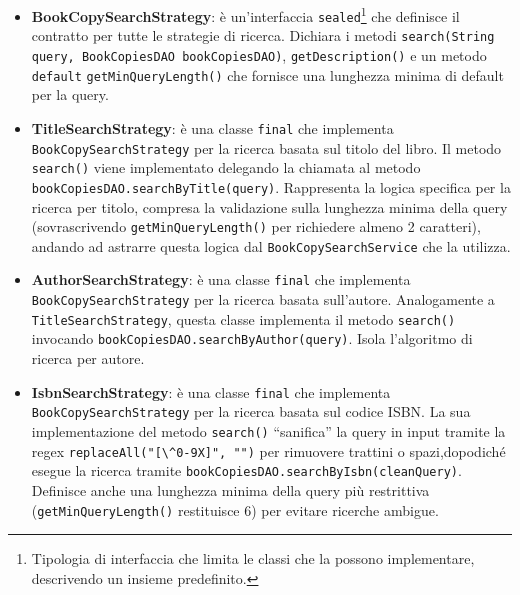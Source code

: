 \documentclass[
  italian,
  paper=a4,
  ,captions=tableheading
]{scrbook}
\newcommand{\passthrough}[1]{#1}
\begin{document}
\begin{itemize}
  \begin{itemize}
  \item
    \textbf{BookCopySearchStrategy}: è un'interfaccia
    \passthrough{\lstinline!sealed!}\footnote{Tipologia di interfaccia che limita le classi che la possono implementare, descrivendo un insieme predefinito.}
    che definisce il contratto per tutte le strategie di ricerca.
    Dichiara i metodi
    \passthrough{\lstinline!search(String query, BookCopiesDAO bookCopiesDAO)!},
    \passthrough{\lstinline!getDescription()!} e un metodo
    \passthrough{\lstinline!default!}
    \passthrough{\lstinline!getMinQueryLength()!} che fornisce una
    lunghezza minima di default per la query.
  \item
    \textbf{TitleSearchStrategy}: è una classe
    \passthrough{\lstinline!final!} che implementa
    \passthrough{\lstinline!BookCopySearchStrategy!} per la ricerca
    basata sul titolo del libro. Il metodo
    \passthrough{\lstinline!search()!} viene implementato delegando la
    chiamata al metodo
    \passthrough{\lstinline!bookCopiesDAO.searchByTitle(query)!}.
    Rappresenta la logica specifica per la ricerca per titolo, compresa
    la validazione sulla lunghezza minima della query (sovrascrivendo
    \passthrough{\lstinline!getMinQueryLength()!} per richiedere almeno
    2 caratteri), andando ad astrarre questa logica dal
    \passthrough{\lstinline!BookCopySearchService!} che la utilizza.
  \item
    \textbf{AuthorSearchStrategy}: è una classe
    \passthrough{\lstinline!final!} che implementa
    \passthrough{\lstinline!BookCopySearchStrategy!} per la ricerca
    basata sull'autore. Analogamente a
    \passthrough{\lstinline!TitleSearchStrategy!}, questa classe
    implementa il metodo \passthrough{\lstinline!search()!} invocando
    \passthrough{\lstinline!bookCopiesDAO.searchByAuthor(query)!}. Isola
    l'algoritmo di ricerca per autore.
  \item
    \textbf{IsbnSearchStrategy}: è una classe
    \passthrough{\lstinline!final!} che implementa
    \passthrough{\lstinline!BookCopySearchStrategy!} per la ricerca
    basata sul codice ISBN. La sua implementazione del metodo
    \passthrough{\lstinline!search()!} ``sanifica'' la query in input
    tramite la regex
    \passthrough{\lstinline!replaceAll("[\^0-9X]", "")!} per rimuovere
    trattini o spazi,dopodiché esegue la ricerca tramite
    \passthrough{\lstinline!bookCopiesDAO.searchByIsbn(cleanQuery)!}.
    Definisce anche una lunghezza minima della query più restrittiva
    (\passthrough{\lstinline!getMinQueryLength()!} restituisce 6) per
    evitare ricerche ambigue.


\end{itemize}
\end{itemize}
\end{document}
